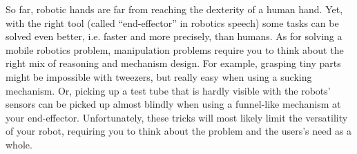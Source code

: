 So far, robotic hands are far from reaching the dexterity of a human hand. Yet, with the right tool (called ``end-effector'' in robotics speech)  some tasks can be solved even better, i.e. faster and more precisely, than humans. As for solving a mobile robotics problem, manipulation problems require you to think about the right mix of reasoning and mechanism design. For example, grasping tiny parts might be impossible with tweezers, but really easy when using a sucking mechanism. Or, picking up a test tube that is hardly visible with the robots' sensors can be picked up almost blindly when using a funnel-like mechanism at your end-effector. Unfortunately, these tricks will most likely limit the versatility of your robot, requiring you to think about the problem and the users's need as a whole.





